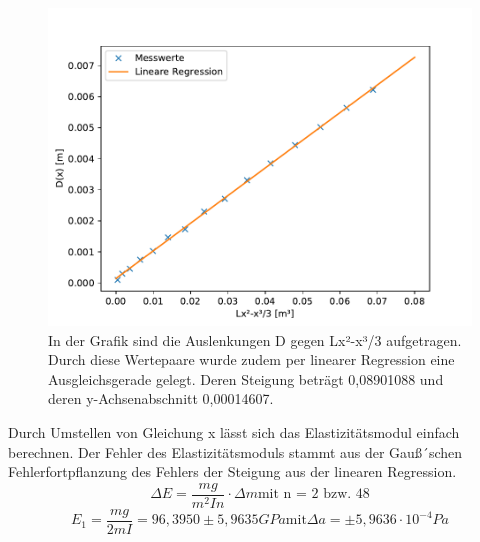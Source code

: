 \documentclass[titlepage = firstcover]{scrartcl}
\begin{document}
        \begin{figure}
          \centering
          \includegraphics[width=0.7\linewidth]{eeins.pdf}
          \caption{In der Grafik sind die Auslenkungen D gegen Lx²-x³/3 aufgetragen. Durch diese Wertepaare wurde zudem per linearer Regression eine Ausgleichsgerade gelegt. Deren Steigung beträgt 0,08901088 und deren y-Achsenabschnitt 0,00014607.}
          \label{fig:graphEeins}
        \end{figure}

        Durch Umstellen von Gleichung x lässt sich das Elastizitätsmodul einfach berechnen. Der Fehler des Elastizitätsmoduls stammt aus der Gauß´schen 
        Fehlerfortpflanzung des Fehlers der Steigung aus der linearen Regression.
        \begin{equation}
          \Delta E = \frac{mg}{m^2 I n} \cdot \Delta m \text{mit n = 2 bzw. 48}
          \label{eqn:Gauß}
        \end{equation}
        \begin{equation*}
          E_1 = \frac{mg}{2mI} = 96,3950 \pm 5,9635 GPa \text{mit} \Delta a = \pm 5,9636 \cdot 10^{-4} Pa
        \end{equation*}
\end{document}
